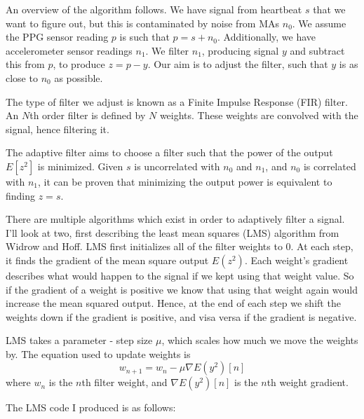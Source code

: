 \documentclass[12pt,a4paper,twoside,openright]{report}
\begin{document}
An overview of the algorithm follows. We have signal from heartbeat \(s\) that
we want to figure out, but this is contaminated by noise from MAs \(n_0\).
We assume the PPG sensor reading \(p\) is such that \(p=s+n_0\). Additionally,
we have accelerometer sensor readings \(n_1\). We filter \(n_1\), producing
signal \(y\) and subtract this from \(p\), to produce \(z=p-y\). Our aim is to
adjust the filter, such that \(y\) is as close to \(n_0\) as possible. 

The type of filter we adjust is known as a Finite Impulse Response (FIR)
filter. An \(N\)th order filter is defined by \(N\) weights.
These weights are convolved with the signal, hence filtering it.

The adaptive filter aims to choose a filter such that the power of the output 
\(E[z^2]\) is minimized. Given \(s\) is uncorrelated with \(n_0\) and \(n_1\), and \(n_0\)
is correlated with \(n_1\), it can be proven that minimizing the output power
is equivalent to finding \(z=s\).

There are multiple algorithms which exist in order to adaptively filter a
signal. I'll look at two, first describing the least mean squares (LMS) algorithm from
Widrow and Hoff. LMS first initializes all of the filter weights to 0. At each
step, it finds the gradient of the mean square output \(E(z^2)\).
Each weight's gradient describes what would happen to the signal if we kept
using that weight value. So if the gradient of a weight is positive we know
that using that weight again would increase the mean squared output. Hence, at
the end of each step we shift the weights down if the gradient is positive,
and visa versa if the gradient is negative.

LMS takes a parameter - step size \(\mu\), which scales how much we move the
weights by. The equation used to update weights is \[w_{n+1}=w_n-\mu \nabla
E(y^2)[n]\]
where \(w_n\) is the \(n\)th filter weight, and \(\nabla E(y^2)[n]\) is the
\(n\)th weight gradient.

The LMS code I produced is as follows:
\end{document}
